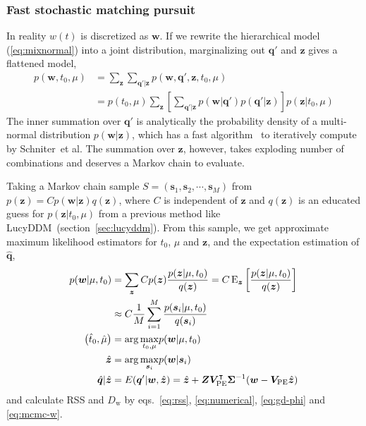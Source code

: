 \subsubsection{Fast stochastic matching pursuit}
\label{subsec:fbmp}
In reality $w(t)$ is discretized as $\bm{w}$. If we rewrite the hierarchical model (\ref{eq:mixnormal}) into a joint distribution, marginalizing out $\bm{q}'$ and $\bm{z}$ gives a flattened model,
\begin{equation}
  \label{eq:universe}
  \begin{aligned}
    p(\bm{w}, t_0, \mu) &= \sum_{\bm{z}} \sum_{\bm{q}'|\bm{z}} p(\bm{w}, \bm{q}', \bm{z}, t_0, \mu) \\
    &= p(t_0, \mu) \sum_{\bm{z}} \left[\sum_{\bm{q}'|\bm{z}} p(\bm{w}|\bm{q}') p(\bm{q}'|\bm{z}) \right] p(\bm{z}|t_0, \mu)
  \end{aligned}
\end{equation}
The inner summation over $\bm{q}'$ is analytically the probability density of a multi-normal distribution $p(\bm{w}|\bm{z})$, which has a fast algorithm~\cite{schniter_fast_2008} to iteratively compute by Schniter~et al. The summation over $\bm{z}$, however, takes exploding number of combinations and deserves a Markov chain to evaluate.

Taking a Markov chain sample $S = (\bm{s}_1, \bm{s}_2, \cdots, \bm{s}_M)$ from $p(\bm{z}) = C p(\bm{w} | \bm{z}) q( \bm{z})$, where $C$ is independent of $\bm{z}$ and $q(\bm{z})$ is an educated guess for $p(\bm{z}|t_0, \mu)$ from a previous method like LucyDDM~(section~\ref{sec:lucyddm}).  From this sample, we get approximate maximum likelihood estimators for $t_0$, $\mu$ and $\bm{z}$, and the expectation estimation of $\hat{\bm{q}}$,
\begin{equation}
  \label{eq:fbmpcharge}
  \begin{aligned}
    p(\bm{w}|\mu, t_0) &= \sum_{\bm{z}} C p(\bm{z}) \frac{p(\bm{z} | \mu, t_0)}{q(\bm{z})} = C \operatorname{E}_{\bm{z}}\left[ \frac{p(\bm{z} | \mu, t_0)}{q(\bm{z})} \right] \\
    &\approx C \frac{1}{M} \sum_{i=1}^M \frac{p(\bm{s}_i | \mu, t_0)}{q(\bm{s}_i)} \\
    \left(\hat{t}_0, \hat{\mu}\right) &= \arg\underset{t_0,\mu}{\max} p(\bm{w}|\mu, t_0) \\
    \hat{\bm{z}} &= \arg \underset{\bm{s}_i}{\max} p(\bm{w}|\bm{s}_i) \\
    \hat{\bm{q}}|{\hat{\bm{z}}} &= E(\bm{q}'|\bm{w},\hat{\bm{z}}) = \hat{\bm{z}} + \bm{Z}\bm{V}_\mathrm{PE}^\intercal\bm{\Sigma}^{-1}(\bm{w}-\bm{V}_\mathrm{PE}\hat{\bm{z}})
  \end{aligned}
\end{equation}
and calculate RSS and $D_\mathrm{w}$ by eqs.~\eqref{eq:rss}, \eqref{eq:numerical}, \eqref{eq:gd-phi} and \eqref{eq:mcmc-w}.

